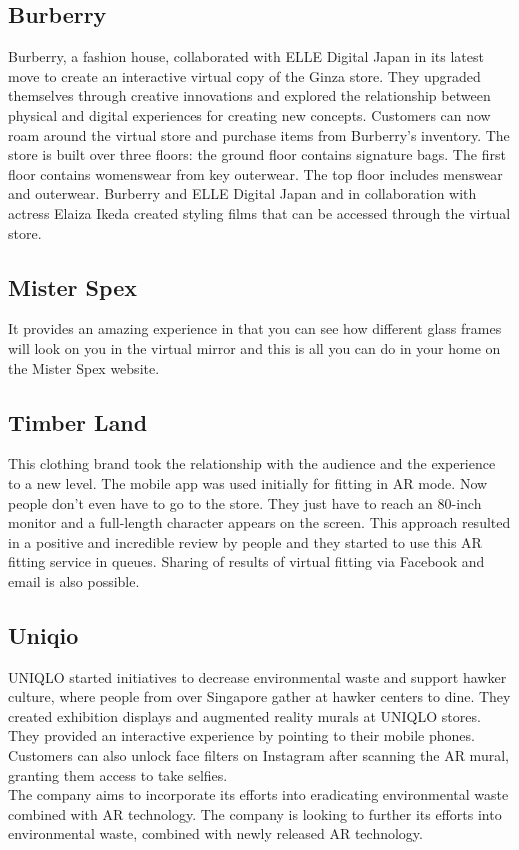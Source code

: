 \subsection{Burberry}
Burberry, a fashion house, collaborated with ELLE Digital Japan in its latest move to create an interactive virtual copy of the Ginza store. They upgraded themselves through creative innovations and explored the relationship between physical and digital experiences for creating new concepts.
Customers can now roam around the virtual store and purchase items from Burberry’s inventory.
The store is built over three floors: the ground floor contains signature bags. The first floor contains womenswear from key outerwear. The top floor includes menswear and outerwear. Burberry and ELLE Digital Japan and in collaboration with actress Elaiza Ikeda created styling films that can be accessed through the virtual store.\cite{Burberry}
\subsection{Mister Spex}
It provides an amazing experience in that you can see how different glass frames will look on you in the virtual mirror and this is all you can do in your home on the Mister Spex website.
\subsection{Timber Land}
This clothing brand took the relationship with the audience and the experience to a new level. The mobile app was used initially for fitting in AR mode. Now people don't even have to go to the store. They just have to reach an 80-inch monitor and a full-length character appears on the screen. This approach resulted in a positive and incredible review by people and they started to use this AR fitting service in queues. Sharing of results of virtual fitting via Facebook and email is also possible.\cite{TIMBERLAND}
\subsection{Uniqio}
UNIQLO started initiatives to decrease environmental waste and support hawker culture, where people from over Singapore gather at hawker centers to dine. They created exhibition displays and augmented reality murals at UNIQLO stores. 
They provided an interactive experience by pointing to their mobile phones. Customers can also unlock face filters on Instagram after scanning the AR mural, granting them access to take selfies.
\\
The company aims to incorporate its efforts into eradicating environmental waste combined with AR technology. The company is looking to further its efforts into environmental waste, combined with newly released AR technology.\cite{UNIQLO}
